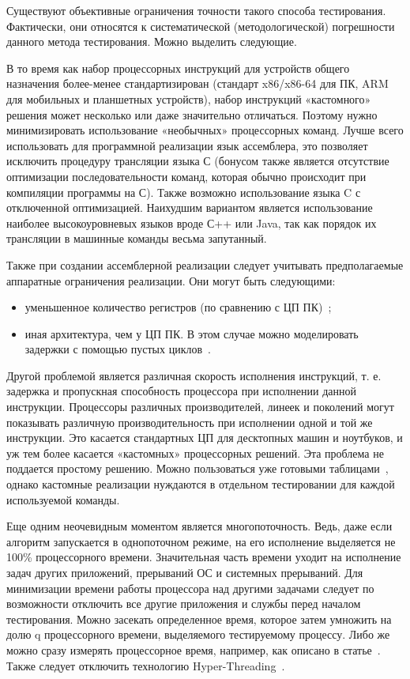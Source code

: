 Существуют объективные ограничения точности такого способа тестирования. Фактически, они относятся к систематической (методологической) погрешности данного метода тестирования. Можно выделить следующие.

В то время как набор процессорных инструкций для устройств общего назначения более-менее стандартизирован (стандарт x86/x86-64 для ПК, ARM для мобильных и планшетных устройств), набор инструкций «кастомного» решения может несколько или даже значительно отличаться. Поэтому нужно минимизировать использование «необычных» процессорных команд. Лучше всего использовать для программной реализации язык ассемблера, это позволяет исключить процедуру трансляции языка С (бонусом также является отсутствие оптимизации последовательности команд, которая обычно происходит при компиляции программы на С). Также возможно использование языка C с отключенной оптимизацией. Наихудшим вариантом является использование наиболее высокоуровневых языков вроде С++ или Java, так как порядок их трансляции в машинные команды весьма запутанный.

Также при создании ассемблерной реализации следует учитывать предполагаемые аппаратные ограничения реализации. Они могут быть следующими:
\begin{itemize}
	\item уменьшенное количество регистров (по сравнению с ЦП ПК)~\cite{src58};
	\item иная архитектура, чем у ЦП ПК. В этом случае можно моделировать задержки с помощью пустых циклов~\cite{src59}.
\end{itemize}

Другой проблемой является различная скорость исполнения инструкций, т. е. задержка и пропускная способность процессора при исполнении данной инструкции. Процессоры различных производителей, линеек и поколений могут показывать различную производительность при исполнении одной и той же инструкции. Это касается стандартных ЦП для десктопных машин и ноутбуков, и уж тем более касается «кастомных» процессорных решений. Эта проблема не поддается простому решению. Можно пользоваться уже готовыми таблицами~\cite{src60}, однако кастомные реализации нуждаются в отдельном тестировании для каждой используемой команды.

Еще одним неочевидным моментом является многопоточность. Ведь, даже если алгоритм запускается в однопоточном режиме, на его исполнение выделяется не 100\% процессорного времени. Значительная часть времени уходит на исполнение задач других приложений, прерываний ОС и системных прерываний. Для минимизации времени работы процессора над другими задачами следует по возможности отключить все другие приложения и службы перед началом тестирования. Можно засекать определенное время, которое затем умножить на долю q процессорного времени, выделяемого тестируемому процессу. Либо же можно сразу измерять процессорное время, например, как описано в статье~\cite{src61}. Также следует отключить технологию Hyper-Threading~\cite{src62}.

